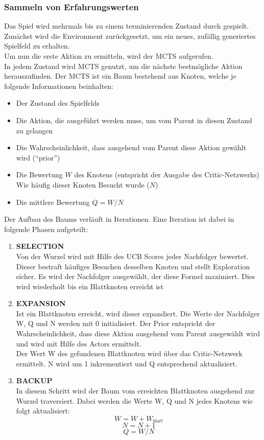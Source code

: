 \subsubsection*{Sammeln von Erfahrungswerten}
Das Spiel wird mehrmals bis zu einem terminierenden Zustand durch gespielt.
\\
Zunächst wird die Environment zurückgesetzt, um ein neues, zufällig generiertes Spielfeld zu erhalten.
\\
Um nun die erste Aktion zu ermitteln, wird der MCTS aufgerufen. 
\\
In jedem Zustand wird MCTS genutzt, um die nächste bestmögliche Aktion herauszufinden. Der MCTS ist ein Baum bestehend aus Knoten, welche je folgende Informationen beinhalten:
\begin{itemize}
	\item Der Zustand des Spielfelds
	\item Die Aktion, die ausgeführt werden muss, um vom Parent in diesen Zustand zu gelangen
	\item Die Wahrscheinlichkeit, dass ausgehend vom Parent diese Aktion gewählt wird (“prior”)
	\item Die Bewertung $W$ des Knotens (entspricht der Ausgabe des Critic-Netzwerks)
	Wie häufig dieser Knoten Besucht wurde ($N$)
	
	\item Die mittlere Bewertung $Q = W / N$
\end{itemize}
Der Aufbau des Baums verläuft in Iterationen. Eine Iteration ist dabei in folgende Phasen aufgeteilt:
\begin{enumerate}
	\item \textbf{SELECTION}\\ 
	Von der Wurzel wird mit Hilfe des UCB Scores jeder Nachfolger bewertet. Dieser bestraft häufiges Besuchen desselben Knoten und stellt Exploration sicher. Es wird der Nachfolger ausgewählt, der diese Formel maximiert. Dies wird wiederholt bis ein Blattknoten erreicht ist
	\item \textbf{EXPANSION}\\
	Ist ein Blattknoten erreicht, wird dieser expandiert. Die Werte der Nachfolger W, Q und N werden mit 0 initialisiert. Der Prior entspricht der Wahrscheinlichkeit, dass diese Aktion ausgehend vom Parent ausgewählt wird und wird mit Hilfe des Actors ermittelt.\\
	Der Wert W des gefundenen Blattknoten wird über das Critic-Netzwerk ermittelt. N wird um 1 inkrementiert und Q entsprechend aktualisiert.
	\item \textbf{BACKUP}\\
	In diesem Schritt wird der Baum vom erreichten Blattknoten ausgehend zur Wurzel traversiert. Dabei werden die Werte W, Q und N jedes Knotens wie folgt aktualisiert:
	\begin{equation}W = W + W_{blatt}\end{equation}
	\begin{equation}N = N + 1\end{equation}
	\begin{equation}Q = W / N\end{equation}
\end{enumerate}

